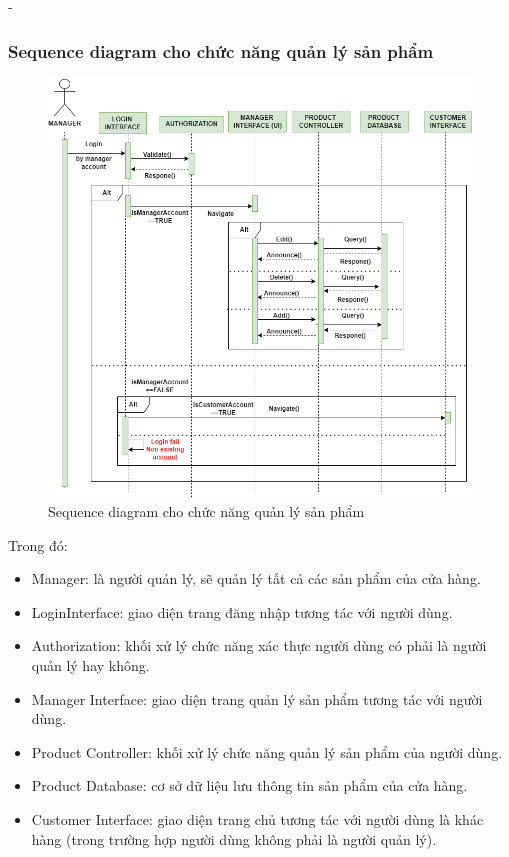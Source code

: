 \begin {list} {-}{}
\subsubsection{Sequence diagram cho chức năng quản lý sản phẩm}
\begin{figure}[h]
    \centering
    \includegraphics[scale=0.5]{images/hieu/chap-3/manage-product-sequence-diagram.png}
    \caption{Sequence diagram cho chức năng quản lý sản phẩm}
\end{figure}
Trong đó:
\begin{itemize}
    \item Manager: là người quản lý, sẽ quản lý tất cả các sản phẩm của cửa hàng.
    \item LoginInterface: giao diện trang đăng nhập tương tác với người dùng.
    \item Authorization: khối xử lý chức năng xác thực người dùng có phải là người quản lý hay không.
    \item Manager Interface: giao diện trang quản lý sản phẩm tương tác với người dùng.
    \item Product Controller: khối xử lý chức năng quản lý sản phẩm của người dùng.
    \item Product Database: cơ sở dữ liệu lưu thông tin sản phẩm của cửa hàng.
    \item Customer Interface: giao diện trang chủ tương tác với người dùng là khác hàng (trong trường hợp người dùng không phải là người quản lý).
\end{itemize}
\newpage

\end{list}
